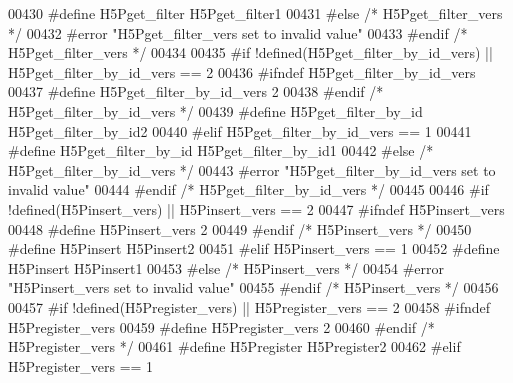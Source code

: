 \begin{DoxyCode}
00430 \textcolor{preprocessor}{  #define H5Pget\_filter H5Pget\_filter1}
00431 \textcolor{preprocessor}{#else }\textcolor{comment}{/* H5Pget\_filter\_vers */}\textcolor{preprocessor}{}
00432 \textcolor{preprocessor}{  #error "H5Pget\_filter\_vers set to invalid value"}
00433 \textcolor{preprocessor}{#endif }\textcolor{comment}{/* H5Pget\_filter\_vers */}\textcolor{preprocessor}{}
00434 
00435 \textcolor{preprocessor}{#if !defined(H5Pget\_filter\_by\_id\_vers) || H5Pget\_filter\_by\_id\_vers == 2}
00436 \textcolor{preprocessor}{  #ifndef H5Pget\_filter\_by\_id\_vers}
00437 \textcolor{preprocessor}{    #define H5Pget\_filter\_by\_id\_vers 2}
00438 \textcolor{preprocessor}{  #endif }\textcolor{comment}{/* H5Pget\_filter\_by\_id\_vers */}\textcolor{preprocessor}{}
00439 \textcolor{preprocessor}{  #define H5Pget\_filter\_by\_id H5Pget\_filter\_by\_id2}
00440 \textcolor{preprocessor}{#elif H5Pget\_filter\_by\_id\_vers == 1}
00441 \textcolor{preprocessor}{  #define H5Pget\_filter\_by\_id H5Pget\_filter\_by\_id1}
00442 \textcolor{preprocessor}{#else }\textcolor{comment}{/* H5Pget\_filter\_by\_id\_vers */}\textcolor{preprocessor}{}
00443 \textcolor{preprocessor}{  #error "H5Pget\_filter\_by\_id\_vers set to invalid value"}
00444 \textcolor{preprocessor}{#endif }\textcolor{comment}{/* H5Pget\_filter\_by\_id\_vers */}\textcolor{preprocessor}{}
00445 
00446 \textcolor{preprocessor}{#if !defined(H5Pinsert\_vers) || H5Pinsert\_vers == 2}
00447 \textcolor{preprocessor}{  #ifndef H5Pinsert\_vers}
00448 \textcolor{preprocessor}{    #define H5Pinsert\_vers 2}
00449 \textcolor{preprocessor}{  #endif }\textcolor{comment}{/* H5Pinsert\_vers */}\textcolor{preprocessor}{}
00450 \textcolor{preprocessor}{  #define H5Pinsert H5Pinsert2}
00451 \textcolor{preprocessor}{#elif H5Pinsert\_vers == 1}
00452 \textcolor{preprocessor}{  #define H5Pinsert H5Pinsert1}
00453 \textcolor{preprocessor}{#else }\textcolor{comment}{/* H5Pinsert\_vers */}\textcolor{preprocessor}{}
00454 \textcolor{preprocessor}{  #error "H5Pinsert\_vers set to invalid value"}
00455 \textcolor{preprocessor}{#endif }\textcolor{comment}{/* H5Pinsert\_vers */}\textcolor{preprocessor}{}
00456 
00457 \textcolor{preprocessor}{#if !defined(H5Pregister\_vers) || H5Pregister\_vers == 2}
00458 \textcolor{preprocessor}{  #ifndef H5Pregister\_vers}
00459 \textcolor{preprocessor}{    #define H5Pregister\_vers 2}
00460 \textcolor{preprocessor}{  #endif }\textcolor{comment}{/* H5Pregister\_vers */}\textcolor{preprocessor}{}
00461 \textcolor{preprocessor}{  #define H5Pregister H5Pregister2}
00462 \textcolor{preprocessor}{#elif H5Pregister\_vers == 1}

\end{DoxyCode}
